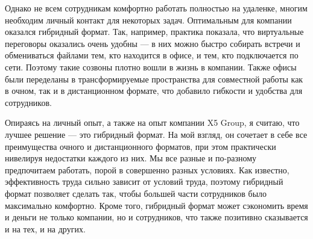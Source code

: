 \documentclass[a4paper, 14pt]{extarticle}
\begin{document}
Однако не всем сотрудникам комфортно работать полностью на удаленке, многим
необходим личный контакт для некоторых задач. Оптимальным для компании оказался
гибридный формат. Так, например, практика показала, что виртуальные переговоры
оказались очень удобны — в них можно быстро собирать встречи и обмениваться
файлами тем, кто находится в офисе, и тем, кто подключается по сети. Поэтому
такие созвоны плотно вошли в жизнь в компании. Также офисы были переделаны в
трансформируемые пространства для совместной работы как в очном, так и в
дистанционном формате, что добавило гибкости и удобства для сотрудников.

Опираясь на личный опыт, а также на опыт компании X5 Group, я считаю, что
лучшее решение --- это гибридный формат. На мой взгляд, он сочетает в себе все
преимущества очного и дистанционного форматов, при этом практически нивелируя
недостатки каждого из них. Мы все разные и по-разному предпочитаем работать,
порой в совершенно разных условиях. Как известно, эффективность труда сильно
зависит от условий труда, поэтому гибридный формат позволяет сделать так, чтобы
большей части сотрудников было максимально комфортно. Кроме того, гибридный
формат может сэкономить время и деньги не только компании, но и сотрудников,
что также позитивно сказывается и на тех, и на других.
\end{document}
